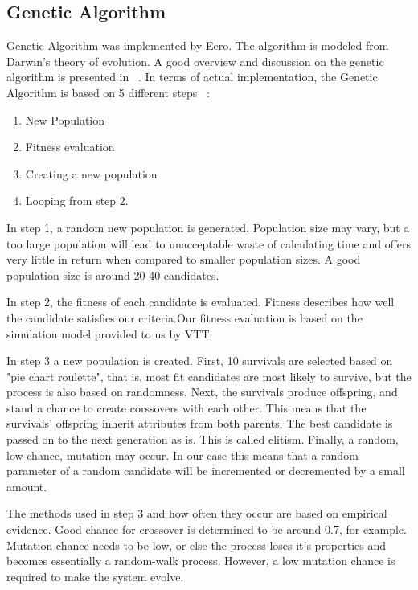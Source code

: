 \documentclass[twoside]{article}
\begin{document}
\begin{multicols}{2}
\section{Genetic Algorithm}

	Genetic Algorithm was implemented by Eero. The algorithm is modeled from Darwin's theory of evolution. A good overview and discussion on the genetic algorithm is presented in ~\cite{mitchell}. In terms of actual implementation, the Genetic Algorithm is based on 5 different steps ~\cite{obitko}:
	\begin{enumerate} \itemsep1pt \parskip0pt 
	\item New Population
	\item Fitness evaluation
	\item Creating a new population
	\item Looping from step 2.
	\end{enumerate}
 	
	In step 1, a random new population is generated.  Population size may vary, but a too large population will lead to unacceptable waste of calculating time and offers very little in return when compared to smaller population sizes. A good population size is around 20-40 candidates.


	In step 2, the fitness of each candidate is evaluated.  Fitness describes how well the candidate satisfies our criteria.Our fitness evaluation is based on the simulation model provided to us by VTT.
	
	In step 3 a new population is created. First, 10 survivals are  selected based on "pie chart roulette", that is, most fit candidates are most likely to survive, but the process is also based on randomness. Next, the survivals produce offspring, and stand a chance to create corssovers with each other. This means that the survivals' offspring inherit attributes from both parents. The best candidate is passed on to the next generation as is. This is called elitism. Finally, a  random, low-chance, mutation may occur. In our case this means that a random parameter  of a random  candidate will be incremented or decremented by a small amount.
	
	The methods used in step 3 and how often they occur are based on empirical evidence. Good  chance for crossover is determined to be around 0.7, for example. Mutation chance needs to be low, or else the process loses it's properties and becomes essentially a random-walk process. However, a low mutation chance is required to make the system evolve.
	

\end{multicols}
\end{document}
